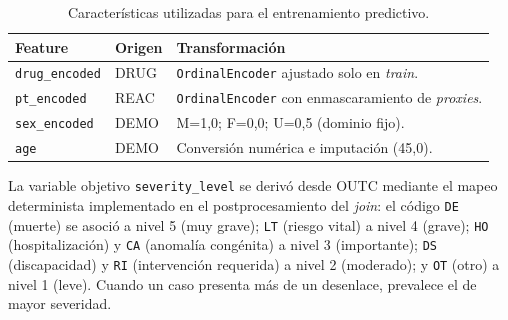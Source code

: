 \documentclass[12pt,a4paper]{article}
\begin{document}
\begin{table}[H]
\centering
\caption{Características utilizadas para el entrenamiento predictivo.}
\label{tab:features}
\small
\begin{tabular}{@{}lll@{}}
\toprule
\textbf{Feature} & \textbf{Origen} & \textbf{Transformación} \\
\midrule
\texttt{drug\_encoded} & DRUG & \texttt{OrdinalEncoder} ajustado solo en \textit{train}. \\
\texttt{pt\_encoded} & REAC & \texttt{OrdinalEncoder} con enmascaramiento de \textit{proxies}. \\
\texttt{sex\_encoded} & DEMO & M=1,0; F=0,0; U=0,5 (dominio fijo). \\
\texttt{age} & DEMO & Conversión numérica e imputación (45,0). \\
\bottomrule
\end{tabular}
\end{table}

La variable objetivo \texttt{severity\_level} se derivó desde OUTC mediante el mapeo determinista implementado en el postprocesamiento del \textit{join}: el código \texttt{DE} (muerte) se asoció a nivel 5 (muy grave); \texttt{LT} (riesgo vital) a nivel 4 (grave); \texttt{HO} (hospitalización) y \texttt{CA} (anomalía congénita) a nivel 3 (importante); \texttt{DS} (discapacidad) y \texttt{RI} (intervención requerida) a nivel 2 (moderado); y \texttt{OT} (otro) a nivel 1 (leve). Cuando un caso presenta más de un desenlace, prevalece el de mayor severidad.
\end{document}
